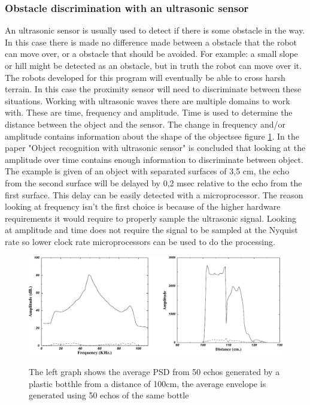 \documentclass[10pt,a4paper]{article}
\begin{document}
\subsubsection{Obstacle discrimination with an ultrasonic sensor}
An ultrasonic sensor is usually used to detect if there is some obstacle in the way. In this case there is made no difference made between a obstacle that the robot can move over, or a obstacle that should be avoided. For example: a small slope or hill might be detected as an obstacle, but in truth the robot can move over it. The robots developed for this program will eventually be able to cross harsh terrain. In this case the proximity sensor will need to discriminate between these situations. Working with ultrasonic waves there are multiple domains to work with. These are time, frequency and amplitude. Time is used to determine the distance between the object and the sensor. The change in frequency and/or amplitude contains information about the shape of the object\cite{ultraobject}see figure \ref{ultrafreq}. In the paper "Object recognition with ultrasonic sensor" is concluded that looking at the amplitude over time contains enough information to discriminate between object\cite{ultraobject}. The example is given of an object with separated surfaces of 3,5 cm, the echo from the second surface will be delayed by 0,2 msec relative to the echo from the first surface. This delay can be easily detected with a microprocessor. The reason looking at frequency isn't the first choice is because of the higher hardware requirements it would require to properly sample the ultrasonic signal. Looking at amplitude and time does not require the signal to be sampled at the Nyquist rate so lower clock rate microprocessors can be used to do the processing.
\\
\begin{figure}[h]
  \centering
      \includegraphics[width=1\textwidth]{ultrafreq.pdf}
  \caption{The left graph shows the average PSD from 50 echos generated by a plastic botthle from a distance of 100cm, the average envelope is generated using 50 echos of the same bottle} \cite{ultraobject}  \label{ultrafreq}
\end{figure}
\newpage
\end{document}

